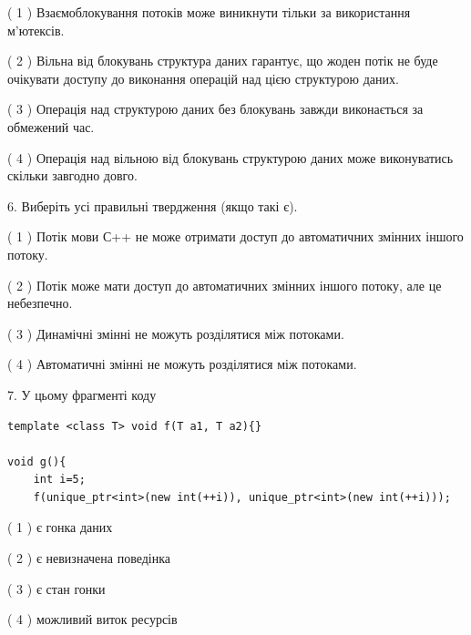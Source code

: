 \documentclass[12pt, ukrainian]{article}
\begin{document}
\begin {large}
{( 1 ) Взаємоблокування потоків може виникнути тільки за використання м’ютексів.%

( 2 ) Вільна від блокувань структура даних гарантує, що жоден потік не буде очікувати доступу до виконання операцій над цією структурою даних.%

( 3 ) Операція над структурою даних без блокувань завжди виконається за обмежений час.%

( 4 ) Операція над вільною від блокувань структурою даних може виконуватись скільки завгодно довго.%
\newpage



\vspace{5mm}
6. Виберіть усі правильні твердження (якщо такі є).\par
\vspace{2mm}

( 1 ) Потік мови С++ не може отримати доступ до автоматичних змінних іншого потоку.%

( 2 ) Потік може мати доступ до автоматичних змінних іншого потоку, але це небезпечно.%

( 3 ) Динамічні змінні не можуть розділятися між потоками.%

( 4 ) Автоматичні змінні не можуть розділятися між потоками.%


\vspace{5mm}
7. У цьому фрагменті коду
\begin{verbatim}
template <class T> void f(T a1, T a2){}

void g(){
    int i=5;
    f(unique_ptr<int>(new int(++i)), unique_ptr<int>(new int(++i)));
\end{verbatim}

( 1 ) є гонка даних%

( 2 ) є невизначена поведінка%

( 3 ) є стан гонки%

( 4 ) можливий виток ресурсів%
}
\end {large}
\end{document}
